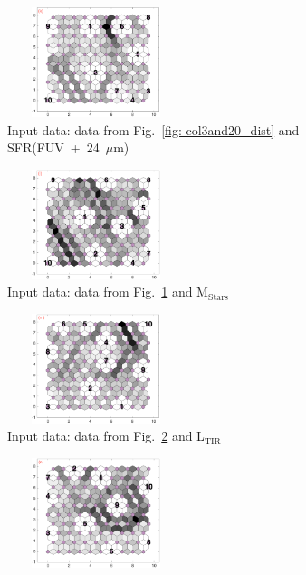 \begin{figure}
\begin{subfigure}[b]{0.25\textwidth}
        \centering
        \includegraphics[width=52mm, height=32mm]{../../images0.01/M31/2D/diff_dimension/combine_2D_data_between_cols3and21.png}
        \captionsetup{font=tiny}
        \caption{Input data: data from Fig.~\ref{fig: col3and20_dist} and SFR(FUV\ +\ 24\ $\mu$m)} 
        \label{fig: col3and21_dist}
    \end{subfigure}
            \hfill
    \begin{subfigure}[b]{0.25\textwidth}
        \centering
        \includegraphics[width=52mm, height=32mm]{../../images0.01/M31/2D/diff_dimension/combine_2D_data_between_cols3and22.png}
        \captionsetup{font=tiny}
        \caption{Input data: data from Fig.~\ref{fig: col3and21_dist} and M$_{\mathrm{ Stars}}$} 
        \label{fig: col3and22_dist}
    \end{subfigure}
            \hfill
    \begin{subfigure}[b]{0.25\textwidth}
        \centering
        \includegraphics[width=52mm, height=32mm]{../../images0.01/M31/2D/diff_dimension/combine_2D_data_between_cols3and23.png}
        \captionsetup{font=tiny}
        \caption{Input data: data from Fig.~\ref{fig: col3and22_dist} and L$_{\mathrm{ TIR}}$} 
        \label{fig: col3and23_dist}
    \end{subfigure}
            \hfill
    \begin{subfigure}[b]{0.25\textwidth}
        \centering
        \includegraphics[width=52mm, height=32mm]{../../images0.01/M31/2D/diff_dimension/combine_2D_data_between_cols3and24.png}

\end{subfigure}
\end{figure}
